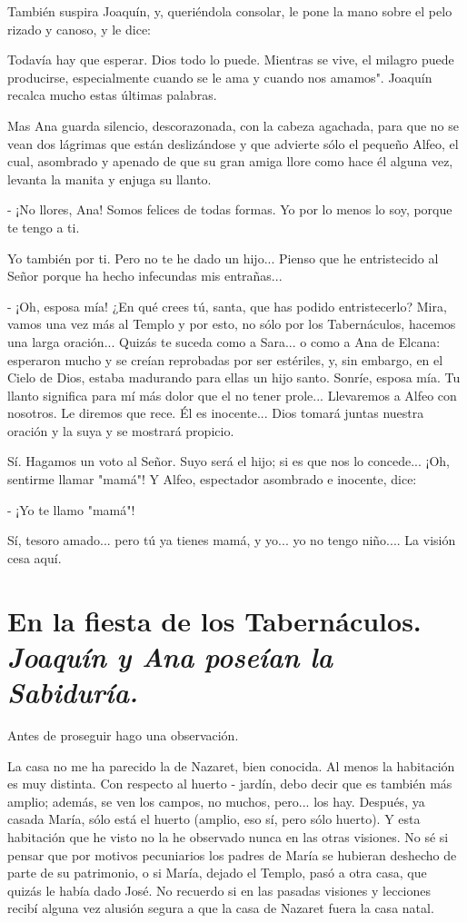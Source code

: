 \documentclass[12pt]{book} %
\begin{document}
También suspira Joaquín, y, queriéndola consolar, le pone la mano sobre el pelo rizado y canoso, y le dice: 

Todavía hay que esperar. Dios todo lo puede. Mientras se vive, el milagro puede producirse, especialmente cuando se le ama y cuando nos amamos". Joaquín recalca mucho estas últimas palabras. 

Mas Ana guarda silencio, descorazonada, con la cabeza agachada, para que no se vean dos lágrimas que están deslizándose y que advierte sólo el pequeño Alfeo, el cual, asombrado y apenado de que su gran amiga llore como hace él alguna vez, levanta la manita y enjuga su llanto. 

- ¡No llores, Ana! Somos felices de todas formas. Yo por lo menos lo soy, porque te tengo a ti. 

Yo también por ti. Pero no te he dado un hijo... Pienso que he entristecido al Señor porque ha hecho infecundas mis entrañas... 

- ¡Oh, esposa mía! ¿En qué crees tú, santa, que has podido entristecerlo? Mira, vamos una vez más al Templo y por esto, no sólo por los Tabernáculos, hacemos una larga oración... Quizás te suceda como a Sara... o como a Ana de Elcana: esperaron mucho y se creían reprobadas por ser estériles, y, sin embargo, en el Cielo de Dios, estaba madurando para ellas un hijo santo. Sonríe, esposa mía. Tu llanto significa para mí más dolor que el no tener prole... Llevaremos a Alfeo con nosotros. Le diremos que rece. Él es inocente... Dios tomará juntas nuestra oración y la suya y se mostrará propicio. 

Sí. Hagamos un voto al Señor. Suyo será el hijo; si es que nos lo concede... ¡Oh, sentirme llamar "mamá"! Y Alfeo, espectador asombrado e inocente, dice: 

- ¡Yo te llamo "mamá"! 

Sí, tesoro amado... pero tú ya tienes mamá, y yo... yo no tengo niño.... La visión cesa aquí. 

\chapter*{En la fiesta de los Tabernáculos. \\ \normalfont\normalsize\textit{Joaquín y Ana poseían la Sabiduría.}}
 
Antes de proseguir hago una observación. 

La casa no me ha parecido la de Nazaret, bien conocida. Al menos la habitación es muy distinta. Con respecto al huerto - jardín, debo decir que es también más amplio; además, se ven los campos, no muchos, pero... los hay. Después, ya casada María, sólo está el huerto (amplio, eso sí, pero sólo huerto). Y esta habitación que he visto no la he observado nunca en las otras visiones. No sé si pensar que por motivos pecuniarios los padres de María se hubieran deshecho de parte de su patrimonio, o si María, dejado el Templo, pasó a otra casa, que quizás le había dado José. No recuerdo si en las pasadas visiones y lecciones recibí alguna vez alusión segura a que la casa de Nazaret fuera la casa natal. 
\end{document}
